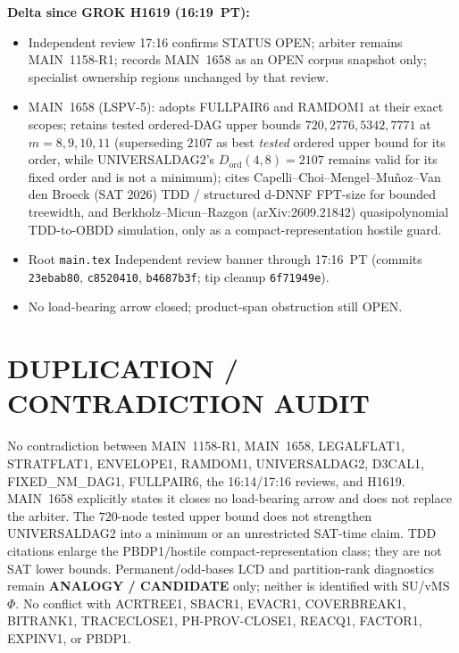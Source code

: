 \documentclass[11pt]{article}
\begin{document}
\textbf{Delta since GROK H1619 (16:19~PT):}
\begin{itemize}
\item Independent review 17:16 confirms STATUS OPEN; arbiter remains MAIN~1158-R1;
records MAIN~1658 as an OPEN corpus snapshot only; specialist ownership regions
unchanged by that review.
\item MAIN~1658 (LSPV-5): adopts FULLPAIR6 and RAMDOM1 at their exact scopes;
retains tested ordered-DAG upper bounds $720,2776,5342,7771$ at $m=8,9,10,11$
(superseding $2107$ as best \emph{tested} ordered upper bound for its order,
while UNIVERSALDAG2's $D_{\mathrm{ord}}(4,8)=2107$ remains valid for its fixed
order and is not a minimum); cites Capelli--Choi--Mengel--Mu\~noz--Van den Broeck
(SAT 2026) TDD / structured d-DNNF FPT-size for bounded treewidth, and
Berkholz--Micun--Razgon (arXiv:2609.21842) quasipolynomial TDD-to-OBDD
simulation, only as a compact-representation hostile guard.
\item Root \texttt{main.tex} Independent review banner through 17:16~PT
(commits \texttt{23ebab80}, \texttt{c8520410}, \texttt{b4687b3f}; tip cleanup
\texttt{6f71949e}).
\item No load-bearing arrow closed; product-span obstruction still OPEN.
\end{itemize}

\section*{DUPLICATION / CONTRADICTION AUDIT}
No contradiction between MAIN~1158-R1, MAIN~1658, LEGALFLAT1, STRATFLAT1,
ENVELOPE1, RAMDOM1, UNIVERSALDAG2, D3CAL1, FIXED\_NM\_DAG1, FULLPAIR6, the
16:14/17:16 reviews, and H1619. MAIN~1658 explicitly states it closes no
load-bearing arrow and does not replace the arbiter. The $720$-node tested
upper bound does not strengthen UNIVERSALDAG2 into a minimum or an unrestricted
SAT-time claim. TDD citations enlarge the PBDP1/hostile compact-representation
class; they are not SAT lower bounds. Permanent/odd-bases LCD and partition-rank
diagnostics remain \textbf{ANALOGY / CANDIDATE} only; neither is identified with
SU/vMS $\Phi$. No conflict with ACRTREE1, SBACR1, EVACR1, COVERBREAK1, BITRANK1,
TRACECLOSE1, PH-PROV-CLOSE1, REACQ1, FACTOR1, EXPINV1, or PBDP1.
\end{document}
